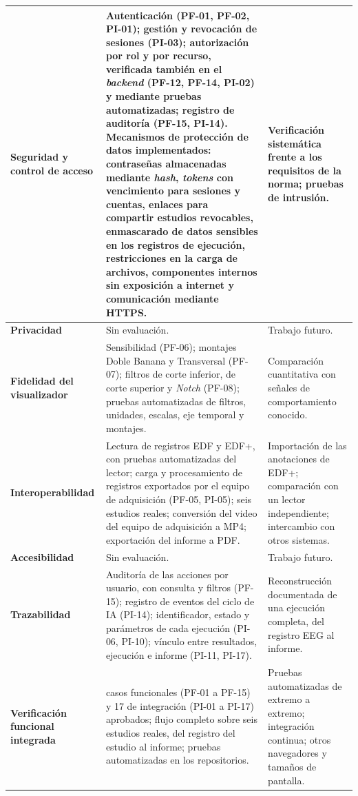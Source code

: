 \begin{longtable}{|>{\raggedright\arraybackslash}p{}|>{\raggedright\arraybackslash}p{}|>{\raggedright\arraybackslash}p{}|}
\textbf{Seguridad y control de acceso} \citep{OWASP2025ASVS} &
Autenticación (PF-01, PF-02, PI-01); gestión y revocación de sesiones (PI-03); autorización por rol y por recurso, verificada también en el \textit{backend} (PF-12, PF-14, PI-02) y mediante pruebas automatizadas; registro de auditoría (PF-15, PI-14). Mecanismos de protección de datos implementados: contraseñas almacenadas mediante \textit{hash}, \textit{tokens} con vencimiento para sesiones y cuentas, enlaces para compartir estudios revocables, enmascarado de datos sensibles en los registros de ejecución, restricciones en la carga de archivos, componentes internos sin exposición a internet y comunicación mediante HTTPS. &
Verificación sistemática frente a los requisitos de la norma; pruebas de intrusión. \\
\hline

\textbf{Privacidad} &
Sin evaluación. &
Trabajo futuro. \\
\hline

\textbf{Fidelidad del visualizador} &
Sensibilidad (PF-06); montajes Doble Banana y Transversal (PF-07); filtros de corte inferior, de corte superior y \textit{Notch} (PF-08); pruebas automatizadas de filtros, unidades, escalas, eje temporal y montajes. &
Comparación cuantitativa con señales de comportamiento conocido. \\
\hline

\textbf{Interoperabilidad} \citep{Kemp1992EDF,KempOlivan2003EDFPlus} &
Lectura de registros EDF y EDF+, con pruebas automatizadas del lector; carga y procesamiento de registros exportados por el equipo de adquisición (PF-05, PI-05); seis estudios reales; conversión del video del equipo de adquisición a MP4; exportación del informe a PDF. &
Importación de las anotaciones de EDF+; comparación con un lector independiente; intercambio con otros sistemas. \\
\hline

\textbf{Accesibilidad} \citep{W3C2023WCAG22} &
Sin evaluación. &
Trabajo futuro. \\
\hline

\textbf{Trazabilidad} &
Auditoría de las acciones por usuario, con consulta y filtros (PF-15); registro de eventos del ciclo de IA (PI-14); identificador, estado y parámetros de cada ejecución (PI-06, PI-10); vínculo entre resultados, ejecución e informe (PI-11, PI-17). &
Reconstrucción documentada de una ejecución completa, del registro EEG al informe. \\
\hline

\textbf{Verificación funcional integrada} &
15 casos funcionales (PF-01 a PF-15) y 17 de integración (PI-01 a PI-17) aprobados; flujo completo sobre seis estudios reales, del registro del estudio al informe; pruebas automatizadas en los repositorios. &
Pruebas automatizadas de extremo a extremo; integración continua; otros navegadores y tamaños de pantalla. \\
\hline

\end{longtable}
\endgroup

